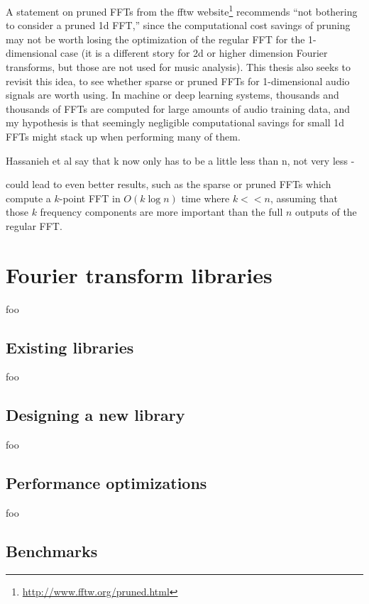 \documentclass[letter,12pt,notitlepage]{article}
\begin{document}
A statement on pruned FFTs from the fftw website\footnote{\href{http://www.fftw.org/pruned.html}{http://www.fftw.org/pruned.html}} recommends ``not bothering to consider a pruned 1d FFT,'' since the computational cost savings of pruning may not be worth losing the optimization of the regular FFT for the 1-dimensional case (it is a different story for 2d or higher dimension Fourier transforms, but those are not used for music analysis). This thesis also seeks to revisit this idea, to see whether sparse or pruned FFTs for 1-dimensional audio signals are worth using. In machine or deep learning systems, thousands and thousands of FFTs are computed for large amounts of audio training data, and my hypothesis is that seemingly negligible computational savings for small 1d FFTs might stack up when performing many of them.

Hassanieh et al say that k now only has to be a little less than n, not very less - 

 could lead to even better results, such as the sparse or pruned FFTs which compute a $k$-point FFT in $O(k \log n)$ time where $k << n$, assuming that those $k$ frequency components are more important than the full $n$ outputs of the regular FFT.

\vfill
\clearpage

\section{Fourier transform libraries}
\label{sec:libraries}

foo

\subsection{Existing libraries}

foo

\subsection{Designing a new library}

foo

\subsection{Performance optimizations}

foo

\subsection{Benchmarks}
\end{document}
